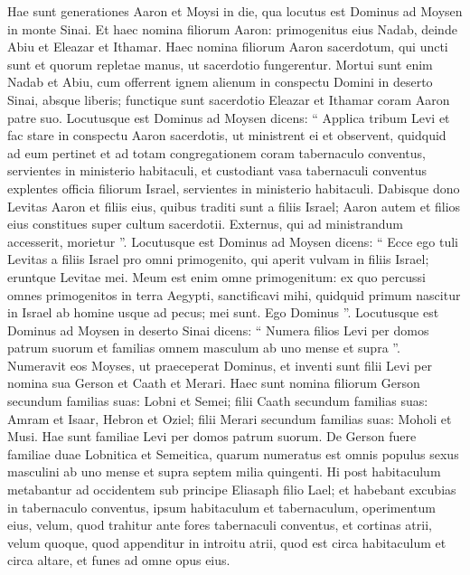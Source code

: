 \begin{biblechapter}
\begin{biblechapter}
\begin{biblechapter}
\verse Hae sunt generationes Aaron et Moysi in die, qua locutus est Dominus ad Moysen in monte Sinai.
 \verse Et haec nomina filiorum Aaron: primogenitus eius Nadab, deinde Abiu et Eleazar et Ithamar. 
\verse Haec nomina filiorum Aaron sacerdotum, qui uncti sunt et quorum repletae manus, ut sacerdotio fungerentur. 
\verse Mortui sunt enim Nadab et Abiu, cum offerrent ignem alienum in conspectu Domini in deserto Sinai, absque liberis; functique sunt sacerdotio Eleazar et Ithamar coram Aaron patre suo.
 \verse Locutusque est Dominus ad Moysen dicens: 
\verse “ Applica tribum Levi et fac stare in conspectu Aaron sacerdotis, ut ministrent ei 
\verse et observent, quidquid ad eum pertinet et ad totam congregationem coram tabernaculo conventus, servientes in ministerio habitaculi, 
\verse et custodiant vasa tabernaculi conventus explentes officia filiorum Israel, servientes in ministerio habitaculi. 
\verse Dabisque dono Levitas Aaron et filiis eius, quibus traditi sunt a filiis Israel; \verse Aaron autem et filios eius constitues super cultum sacerdotii. Externus, qui ad ministrandum accesserit, morietur ”.
 \verse Locutusque est Dominus ad Moysen dicens: 
\verse “ Ecce ego tuli Levitas a filiis Israel pro omni primogenito, qui aperit vulvam in filiis Israel; eruntque Levitae mei. 
\verse Meum est enim omne primogenitum: ex quo percussi omnes primogenitos in terra Aegypti, sanctificavi mihi, quidquid primum nascitur in Israel ab homine usque ad pecus; mei sunt. Ego Dominus ”.
 \verse Locutusque est Dominus ad Moysen in deserto Sinai dicens: 
\verse “ Numera filios Levi per domos patrum suorum et familias omnem masculum ab uno mense et supra ”. 
\verse Numeravit eos Moyses, ut praeceperat Dominus, 
\verse et inventi sunt filii Levi per nomina sua Gerson et Caath et Merari. 
\verse Haec sunt nomina filiorum Gerson secundum familias suas: Lobni et Semei; 
\verse filii Caath secundum familias suas: Amram et Isaar, Hebron et Oziel; 
\verse filii Merari secundum familias suas: Moholi et Musi. Hae sunt familiae Levi per domos patrum suorum.
 \verse De Gerson fuere familiae duae Lobnitica et Semeitica, 
\verse quarum numeratus est omnis populus sexus masculini ab uno mense et supra septem milia quingenti. 
 \verse Hi post habitaculum metabantur ad occidentem 
\verse sub principe Eliasaph filio Lael; 
\verse et habebant excubias in tabernaculo conventus, ipsum habitaculum et tabernaculum, operimentum eius, velum, quod trahitur ante fores tabernaculi conventus, 
\verse et cortinas atrii, velum quoque, quod appenditur in introitu atrii, quod est circa habitaculum et circa altare, et funes ad omne opus eius.

\end{biblechapter}
\end{biblechapter}
\end{biblechapter}
